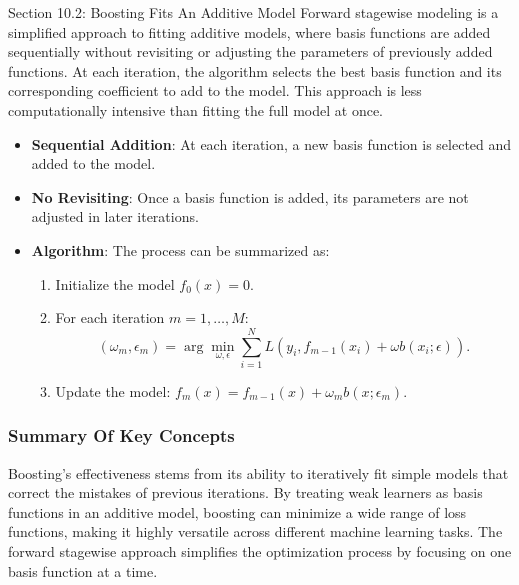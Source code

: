 \begin{notes}{Section 10.2: Boosting Fits An Additive Model}
    Forward stagewise modeling is a simplified approach to fitting additive models, where basis functions are added sequentially without revisiting or adjusting the parameters of previously added 
    functions. At each iteration, the algorithm selects the best basis function and its corresponding coefficient to add to the model. This approach is less computationally intensive than fitting the 
    full model at once.
    
    \begin{highlight}
        \begin{itemize}
            \item \textbf{Sequential Addition}: At each iteration, a new basis function is selected and added to the model.
            \item \textbf{No Revisiting}: Once a basis function is added, its parameters are not adjusted in later iterations.
            \item \textbf{Algorithm}: The process can be summarized as:
            \begin{enumerate}
                \item Initialize the model $f_0(x) = 0$.
                \item For each iteration $m = 1, \dots, M$:
                \[
                (\omega_m, \epsilon_m) = \arg\min_{\omega, \epsilon} \sum_{i=1}^{N} L(y_i, f_{m-1}(x_i) + \omega b(x_i; \epsilon)).
                \]
                \item Update the model: $f_m(x) = f_{m-1}(x) + \omega_m b(x; \epsilon_m)$.
            \end{enumerate}
        \end{itemize}
    \end{highlight}
    
    \subsubsection*{Summary Of Key Concepts}
    
    Boosting's effectiveness stems from its ability to iteratively fit simple models that correct the mistakes of previous iterations. By treating weak learners as basis functions in an additive model, 
    boosting can minimize a wide range of loss functions, making it highly versatile across different machine learning tasks. The forward stagewise approach simplifies the optimization process by 
    focusing on one basis function at a time.
    

\end{notes}
